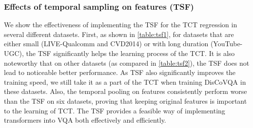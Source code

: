 \documentclass[journal]{IEEEtran}
\begin{document}
\begin{table}

\caption{Ablation study of the TSF on other datasets.} \label{table:tsf2}

\setlength\tabcolsep{2.5pt}
\renewcommand\arraystretch{1.25}
\footnotesize
\center
{}
\end{table}


\subsubsection{Effects of temporal sampling on features (TSF)}  We show the effectiveness of implementing the TSF for the TCT regression in several different datasets. First, as shown in \cref{table:tsf1}, for datasets that are either small (LIVE-Qualcomm and CVD2014) or with long duration (YouTube-UGC), the TSF significantly helps the learning process of the TCT. It is also noteworthy that on other datasets (as compared in \cref{table:tsf2}), the TSF does not lead to noticeable better performance. As TSF also significantly improves the training speed, we still take it as a part of the TCT when training DisCoVQA in these datasets. Also, the temporal pooling on features consistently perform worse than the TSF on six datasets, proving that keeping original features is important to the learning of TCT. The TSF provides a feasible way of implementing transformers into VQA both effectively and efficiently.
\end{document}
